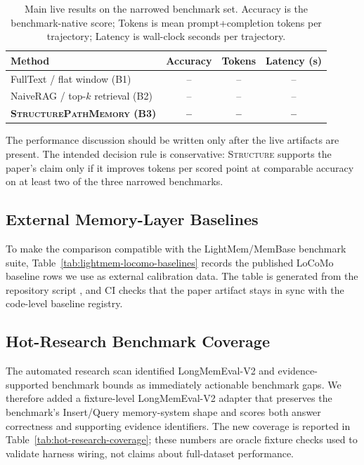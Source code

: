 \begin{table}[t]
    \centering
    \small
    \begin{tabular}{p{}ccc}
        \toprule
        Method & Accuracy & Tokens & Latency (s) \\
        \midrule
        FullText / flat window (B1) & -- & -- & -- \\
        NaiveRAG / top-$k$ retrieval (B2) & -- & -- & -- \\
        \midrule
        \textbf{\textsc{StructurePathMemory} (B3)} & \textbf{--} & \textbf{--} & \textbf{--} \\
        \bottomrule
    \end{tabular}
    \caption{Main live results on the narrowed benchmark set. Accuracy
    is the benchmark-native score; Tokens is mean prompt+completion
    tokens per trajectory; Latency is wall-clock seconds per
    trajectory.}
    \label{tab:main}
\end{table}

The performance discussion should be written only after the live
artifacts are present. The intended decision rule is conservative:
\textsc{Structure} supports the paper's claim only if it improves
tokens per scored point at comparable accuracy on at least two of the
three narrowed benchmarks.

\subsection{External Memory-Layer Baselines}

To make the comparison compatible with the LightMem/MemBase benchmark
suite, Table~\ref{tab:lightmem-locomo-baselines} records the published
LoCoMo baseline rows we use as external calibration data. The table is
generated from the repository script
, and CI
checks that the paper artifact stays in sync with the code-level
baseline registry.



\subsection{Hot-Research Benchmark Coverage}

The automated research scan identified LongMemEval-V2
\citep{wu2026longmemevalv2} and evidence-supported benchmark bounds
\citep{gao2026evidencebounds} as immediately actionable benchmark
gaps. We therefore added a fixture-level LongMemEval-V2 adapter that
preserves the benchmark's Insert/Query memory-system shape and scores
both answer correctness and supporting evidence identifiers. The new
coverage is reported in Table~\ref{tab:hot-research-coverage}; these
numbers are oracle fixture checks used to validate harness wiring, not
claims about full-dataset performance.

